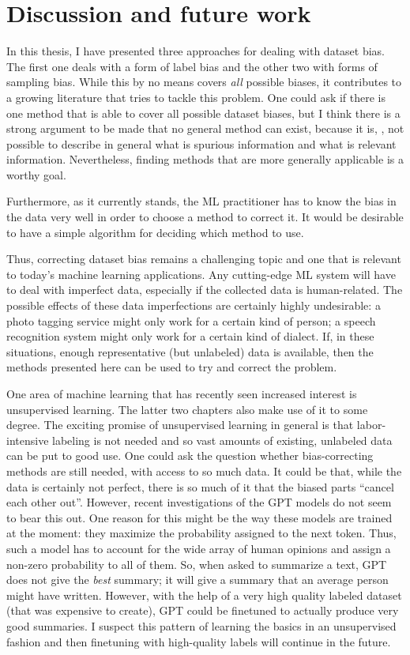 \chapter{Discussion and future work}\label{ch:conclusion}
In this thesis, I have presented three approaches for dealing with dataset bias.
The first one deals with a form of label bias and the other two with forms of sampling bias.
While this by no means covers \emph{all} possible biases,
it contributes to a growing literature that tries to tackle this problem.
One could ask if there is one method that is able to cover all possible dataset biases,
but I think there is a strong argument to be made that no general method can exist,
because it is, \eg, not possible to describe in general what is spurious information and what is relevant information.
Nevertheless, finding methods that are more generally applicable is a worthy goal.

Furthermore, as it currently stands,
the \ac{ML} practitioner has to know the bias in the data very well in order to choose a method to correct it.
It would be desirable to have a simple algorithm for deciding which method to use.

Thus, correcting dataset bias remains a challenging topic
and one that is relevant to today's machine learning applications.
Any cutting-edge \ac{ML} system will have to deal with imperfect data,
especially if the collected data is human-related.
The possible effects of these data imperfections are certainly highly undesirable:
a photo tagging service might only work for a certain kind of person;
a speech recognition system might only work for a certain kind of dialect.
If, in these situations, enough representative (but unlabeled) data is available,
then the methods presented here can be used to try and correct the problem.

One area of machine learning that has recently seen increased interest is unsupervised learning.
The latter two chapters also make use of it to some degree.
The exciting promise of unsupervised learning in general is
that labor-intensive labeling is not needed and so vast amounts of existing, unlabeled data can be put to good use.
One could ask the question whether bias-correcting methods are still needed, with access to so much data.
It could be that, while the data is certainly not perfect,
there is so much of it that the biased parts ``cancel each other out''.
However, recent investigations of the GPT models do not seem to bear this out.
One reason for this might be the way these models are trained at the moment:
they maximize the probability assigned to the next token.
Thus, such a model has to account for the wide array of human opinions and assign a non-zero probability to all of them.
So, when asked to summarize a text, GPT does not give the \emph{best} summary;
it will give a summary that an average person might have written.
However, with the help of a very high quality labeled dataset (that was expensive to create),
GPT could be finetuned to actually produce very good summaries.
I suspect this pattern of learning the basics in an unsupervised fashion
and then finetuning with high-quality labels will continue in the future.
